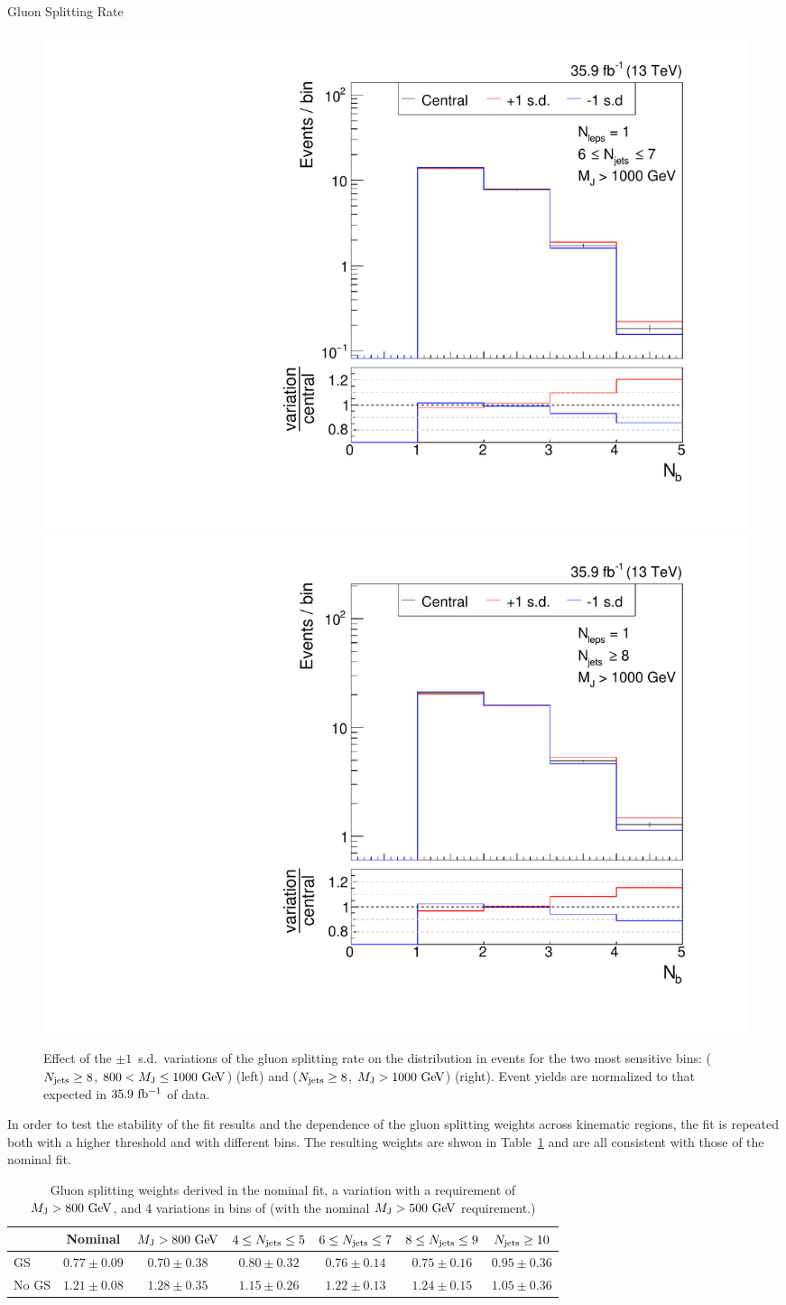 \begin{section}{Gluon Splitting Rate}
\begin{figure}[tbp!]
\begin{center}
\includegraphics[angle=0,width=0.45\columnwidth]{fig/bin20_ttbar_gs_mconly.pdf}
\includegraphics[angle=0,width=0.45\columnwidth]{fig/bin21_ttbar_gs_mconly.pdf}
\end{center}
\caption{Effect of the $\pm 1$~s.d.\ variations of the gluon splitting rate on the \Nb distribution in \ttbar events for the two most sensitive bins: ($N_{\mathrm{jets}} \geq 8$, $800 < M_{\mathrm{J}} \leq 1000~\mathrm{Ge\kern -0.1em V}$) (left) and ($N_{\mathrm{jets}} \geq 8$, $M_{\mathrm{J}} > 1000~\mathrm{Ge\kern -0.1em V}$) (right).
Event yields are normalized to that expected in $35.9~\mathrm{fb^{-1}}$ of data.}
\label{fig:gs_variations}
\end{figure}

In order to test the stability of the fit results and the dependence of the gluon splitting weights across kinematic regions, the \dRbb fit is repeated both with a higher \MJ threshold and with different \Njets bins. 
The resulting weights are shwon in Table~\ref{tab:gs_variations} and are all consistent with those of the nominal fit.

\begin{table}[tb!]
\setlength\tabcolsep{3pt}
\centering
\begin{tabular}{l|cccccc}
 & Nominal & $M_{\mathrm{J}} > 800~\mathrm{Ge\kern -0.1em V}$ & $4 \leq N_{\mathrm{jets}} \leq 5$ & $6 \leq N_{\mathrm{jets}} \leq 7$ & $8 \leq N_{\mathrm{jets}} \leq 9$ & $N_{\mathrm{jets}} \geq 10$ \\
\hline
GS    & $0.77 \pm 0.09$ & $0.70 \pm 0.38$ & $ 0.80 \pm 0.32$  & $ 0.76 \pm 0.14$ & $ 0.75 \pm 0.16$  & $ 0.95 \pm 0.36$ \\
No GS & $1.21 \pm 0.08$ & $1.28 \pm 0.35$ & $ 1.15 \pm 0.26$  & $ 1.22 \pm 0.13$ & $ 1.24 \pm 0.15$  & $ 1.05 \pm 0.36$ \\
\end{tabular}
\caption{Gluon splitting weights derived in the nominal fit, a variation with a requirement of $M_{\mathrm{J}} > 800~\mathrm{Ge\kern -0.1em V}$, and 4 variations in bins of \Njets (with the nominal $M_{\mathrm{J}} > 500~\mathrm{Ge\kern -0.1em V}$ requirement.)}
\label{tab:gs_variations}
\end{table}

\end{section}

